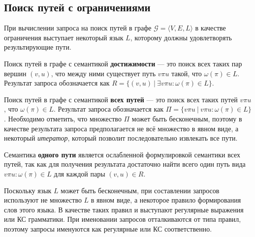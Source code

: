 
\subsection{Поиск путей с ограничениями}

При вычислении запроса на поиск путей в графе $\mathcal{G} = \langle V, E, L \rangle$ в качестве ограничения выступает некоторый язык $L$, которому должны удовлетворять результирующие пути.

Поиск путей в графе с семантикой \textbf{достижимости} --- это поиск всех таких пар вершин $(v,u)$, что между ними существует путь $v \pi u$ такой, что $\omega (\pi) \in L$. Результат запроса обозначается как $R = \{ (v,u)~|~\exists v \pi u : \omega (\pi) \in L \}$.

Поиск путей в графе с семантикой \textbf{всех путей} --- это поиск всех таких путей $v \pi u$,   что $\omega (\pi) \in L$. Результат запроса обозначается как $\Pi = \{ v \pi u~|~v \pi u : \omega (\pi) \in L \}$.
Необходимо отметить, что множество $\Pi$ может быть бесконечным, поэтому в качестве результата запроса предполагается не всё множество в явном виде, а некоторый \textit{итератор}, который позволит последовательно извлекать все пути.

Семантика \textbf{одного пути} является ослабленной формулировкой семантики всех путей, так как для получения результата достаточно найти всего один путь вида $v \pi u : \omega (\pi) \in L$ для каждой пары $(v, u) \in R$.

Поскольку язык $L$ может быть бесконечным, при составлении запросов используют не множество $L$ в явном виде, а некоторое правило формирования слов этого языка. В качестве таких правил и выступают регулярные выражения или КС грамматики. При именовании запросов отталкиваются от типа правил, поэтому запросы именуются как регулярные или КС соответственно.


